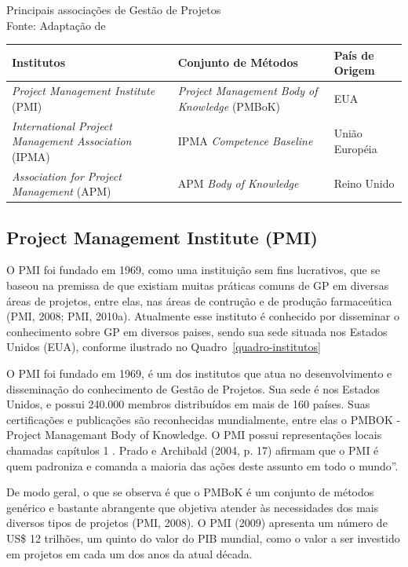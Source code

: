   \begin{quadro}[!htpb]
    \centering
    \label{quadro-institutos}
    \caption{Principais associações de Gestão de Projetos \\ Fonte: Adaptação de }
    \begin{tabular}{| m{} m{} m{}|}
      \hline
      \textbf{Institutos} & \textbf{Conjunto de Métodos} & \textbf{País de Origem} \\
      \hline \hline
      \textit{Project Management Institute} (PMI) & \textit{Project Management Body of Knowledge} (PMBoK) & EUA \\ \hline
      \textit{International Project Management Association} (IPMA) & IPMA \textit{Competence Baseline} & União Européia \\ \hline
      \textit{Association for Project Management} (APM) & APM \textit{Body of Knowledge} & Reino Unido \\ \hline
    \end{tabular}
  \end{quadro}

  \subsection{Project Management Institute (PMI)}

  O PMI foi fundado em 1969, como uma instituição sem fins lucrativos, que se baseou na premissa de que existiam muitas práticas comuns de GP em diversas áreas de projetos, entre elas, nas áreas de contrução e de produção farmaceútica (PMI, 2008; PMI, 2010a). Atualmente esse instituto é conhecido por disseminar o conhecimento sobre GP em diversos paises, sendo sua sede situada nos Estados Unidos (EUA), conforme ilustrado no Quadro~\ref{quadro-institutos}

O PMI foi fundado em 1969, é um dos institutos que atua no desenvolvimento e disseminação do conhecimento de Gestão de Projetos. Sua sede é nos Estados Unidos, e possui 240.000 membros distribuídos em mais de 160 países. Suas certificações e publicações são reconhecidas mundialmente, entre elas o PMBOK - Project Managemant Body of Knowledge. O PMI possui representações locais chamadas capítulos 1 . Prado e Archibald (2004, p. 17) afirmam que o PMI é quem padroniza e comanda a maioria das ações deste assunto em todo o mundo”.

De modo geral, o que se observa é que o PMBoK é um conjunto de métodos genérico e bastante abrangente que objetiva atender às necessidades dos mais diversos tipos de projetos (PMI, 2008).
O PMI (2009) apresenta um número de US\$ 12 trilhões, um quinto do valor do PIB mundial, como o valor a ser investido em projetos em cada um dos anos da atual década.

